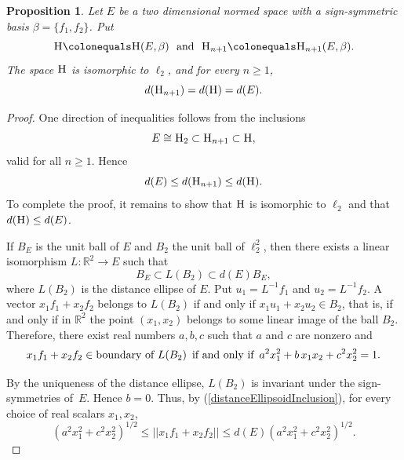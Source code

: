 \documentclass{article}[1100]
\newtheorem{proposition}[theorem]{Proposition}
\theoremstyle{definition}
\theoremstyle{remark}
\newcommand\Ren[1]{\mathbb{R}^{#1}}
\newcommand\norma[1]{|\!|#1|\!|}
\newcommand\mySpaceH[1]{\textsc{H}(#1)}
\newcommand\mySpace[2]{\textsc{H}_{#1}(#2)}
\begin{document}
\begin{tcolorbox}
\begin{proposition}\label{distanceProposition} Let $E$ be a two dimensional normed space  with a  sign-symmetric basis 
${\beta=\{f_1,f_2\}}$.
Put
\[ \textsc{H}\colonequals\mySpaceH{E,\beta} \ \  \mbox{and} \ \  \textsc{H}_{n+1}\colonequals\mySpace{n+1}{E,\beta}.\] 
The space $\textsc{H}$ is isomorphic to $\ell_2$, and for every $n\geq 1$,
\begin{equation}\label{equalDistances}
d(\textsc{H}_{n+1})= d(\textsc{H})=d(E).
\end{equation}
\end{proposition}
\end{tcolorbox}
\begin{proof}
One direction of inequalities follows from the inclusions
\[ E\cong\textsc{H}_2\subset\textsc{H}_{n+1}\subset\textsc{H},\] 
valid for all $n\geq 1$. Hence
\[ d(E)\leq d(\textsc{H}_{n+1})\leq d(\textsc{H}).\]
To complete the proof, it remains to show that $\textsc{H}$ is isomorphic to $\ell_2$ and that ${d(\textsc{H})\leq d(E)}$.

\medskip

If $B_{\scriptscriptstyle E}$ is the unit ball of $E$ and $B_2$ the unit ball of $\ell_2^2$, then there exists a linear isomorphism ${L:\Ren{2}\to E}$  such that
\begin{equation}\label{distanceEllipsoidInclusion}
B_{\scriptscriptstyle E}\subset L(B_2)\subset d(E)B_{\scriptscriptstyle E},
\end{equation}
where $L(B_2)$ is the distance ellipse of $E$. Put $u_1=L^{-1}f_1$ and $u_2=L^{-1}f_2$. A vector $x_1f_1+x_2f_2$ belongs to $L(B_2)$ if and only if $x_1u_1+x_2u_2\in B_2$, that is, if and only if in $\Ren{2}$ the point $(x_1,x_2)$
belongs to some linear image of the ball $B_2$. Therefore, there exist real numbers $a,b,c$ such that $a$ and $c$ are nonzero and
\[ x_1f_1+x_2f_2\in\hbox{boundary of  $L(B_2)$}\enspace\hbox{if and only if}\enspace a^2x_1^2+b\,x_1x_2+c^2x_2^2=1. \]


By the uniqueness of the distance ellipse, $L(B_2)$  is invariant under the  sign-symmetries of~$E$.  Hence $b=0$.  
Thus, by (\ref{distanceEllipsoidInclusion}), for every choice of real scalars $x_1,x_2$,
\begin{equation}\label{distance}
(a^2x_1^2+c^2x_2^2)^{1/2}\leq \norma{x_1 f_1+x_2 f_2}\leq d(E) (a^2x_1^2+c^2x_2^2)^{1/2}.
\end{equation}


\end{proof}
\end{document}
